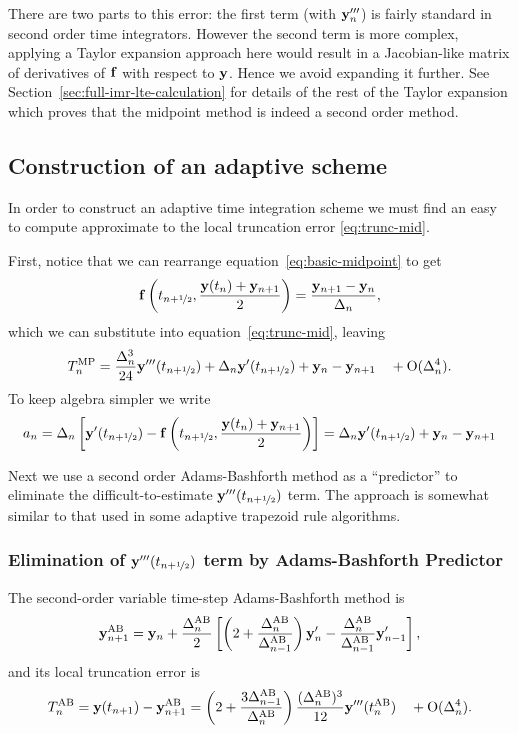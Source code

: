 There are two parts to this error: the first term (with $\yv'''_n$) is fairly standard in second order time integrators.
However the second term is more complex, applying a Taylor expansion approach here would result in a Jacobian-like matrix of derivatives of $\fv$ with respect to $\yv$.
Hence we avoid expanding it further.
See Section~\ref{sec:full-imr-lte-calculation} for details of the rest of the Taylor expansion which proves that the midpoint method is indeed a second order method.



\subsection{Construction of an adaptive scheme}

In order to construct an adaptive time integration scheme we must find an easy to compute approximate to the local truncation error \eqref{eq:trunc-mid}.

First, notice that we can rearrange equation~\eqref{eq:basic-midpoint} to get
\begin{equation}
  \fv\left( \thf, \frac{\yv(t_n) + \yv_{n+1}}{2} \right) = \frac{\yv_{n+1} - \yv_n}{\dtn},
\end{equation}
which we can substitute into equation~\eqref{eq:trunc-mid}, leaving
\begin{equation}
  \lte^\IMP = \frac{\dtn^3}{24} \yvhf[''']  + \dtn \yvhf['] + \yv_n - \yv_{n+1}
  \porder{\dtn^4}.
\end{equation}
To keep algebra simpler we write
\begin{equation}
   \ymiderr = \dtn  \left[ \yvhf[']
  - \fv\left( \thf, \frac{\yv(t_n) + \yv_{n+1}}{2} \right) \right] =  \dtn \yvhf['] + \yv_n - \yv_{n+1}
\end{equation}

Next we use a second order Adams-Bashforth method as a ``predictor'' to eliminate the difficult-to-estimate $\yvhf[''']$ term.
The approach is somewhat similar to that used in some adaptive trapezoid rule algorithms.\cite[p.707]{Gresho-Sani}

\subsubsection{Elimination of $\yvhf[''']$ term by Adams-Bashforth Predictor}
The second-order variable time-step Adams-Bashforth method is\cite[p.267]{Gresho-Sani}
\begin{equation}
  \yv_{n+1}^{\AB} = \yv_n + \frac{\dtn^\AB}{2} \left[
    \left (2 + \frac{\dtn^\AB}{\dtx{n-1}^\AB} \right) \yv'_n
    - \frac{\dtn^\AB}{\dtx{n-1}^\AB} \yv'_{n-1}
    \right],
  \label{eq:AB2}
\end{equation}
and its local truncation error is\cite[p.267]{Gresho-Sani}
\begin{equation}
  \lte^{\AB} = \yv(t_{n+1}) - \yv_{n+1}^{\AB}
  = \left( 2 + \frac{3 \dtx{n-1}^\AB}{\dtn^\AB} \right) \frac{(\dtn^\AB)^3}{12} \yv'''(t_n^\AB)
  \porder{\dtn^4}.
  \label{eq:AB2LTE}
\end{equation}

